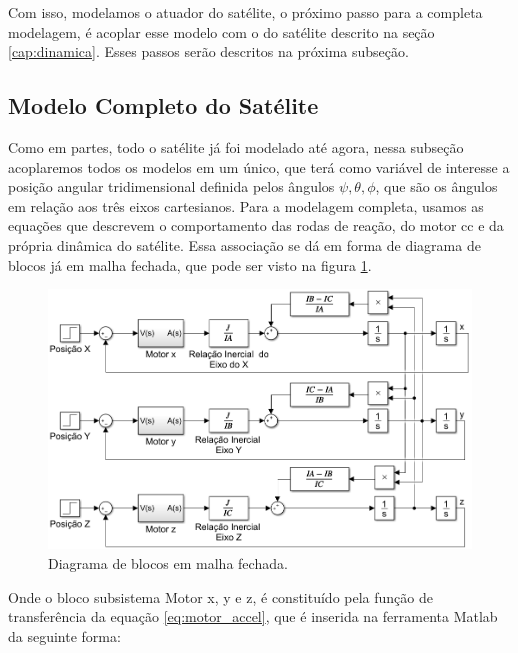 Com isso, modelamos o atuador do satélite, o próximo passo para a completa modelagem, é acoplar esse modelo com o do satélite descrito na seção \ref{cap:dinamica}. Esses passos serão descritos na próxima subseção.



\subsection{Modelo Completo do Satélite}

Como em partes, todo o satélite já foi modelado até agora, nessa subseção acoplaremos todos os modelos em um único, que terá como variável de interesse a posição angular tridimensional definida pelos ângulos $\psi, \theta, \phi$, que são os ângulos em relação aos três eixos cartesianos. Para a modelagem completa, usamos as equações que descrevem o comportamento das rodas de reação, do motor cc e da própria dinâmica do satélite. Essa associação se dá em forma de diagrama de blocos já em malha fechada, que pode ser visto na figura \ref{fig:simulink_modelo_completo_aberto}.

\begin{figure}[H]
  \caption{Diagrama de blocos em malha fechada.}
  \begin{center}
      \includegraphics[scale=.6]{metodologia/img/simulink_modelo_completo_aberto}
  \end{center}
  \label{fig:simulink_modelo_completo_aberto}
\end{figure}

Onde o bloco subsistema Motor x, y e z, é constituído pela função de transferência da equação \ref{eq:motor_accel}, que é inserida na ferramenta Matlab da seguinte forma:

